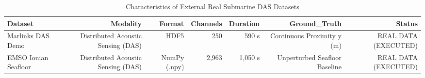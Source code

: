 \begin{table}[htbp]
\centering
\caption{Characteristics of External Real Submarine DAS Datasets}
\begin{tabular}{lrrrrrr}
\toprule
Dataset & Modality & Format & Channels & Duration & Ground\_Truth & Status \\
\midrule
Marlinks DAS Demo & Distributed Acoustic Sensing (DAS) & HDF5 & 250 & 590 s & Continuous Proximity y (m) & REAL DATA (EXECUTED) \\
EMSO Ionian Seafloor & Distributed Acoustic Sensing (DAS) & NumPy (.npy) & 2,963 & 1,050 s & Unperturbed Seafloor Baseline & REAL DATA (EXECUTED) \\
\bottomrule
\end{tabular}
\end{table}
